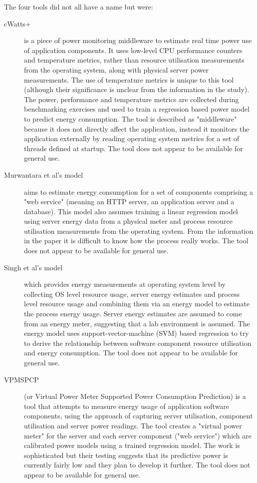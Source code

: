 The four tools did not all have a name but were:
\begin{description}
	\item[cWatts+] is a piece of power monitoring middleware to estimate real time power use of application components.  It uses low-level CPU performance counters and temperature metrics, rather than resource utilisation measurements from the operating system, along with physical server power measurements.  The use of temperature metrics is unique to this tool (although their significance is unclear from the information in the study).  The power, performance and temperature metrics are collected during benchmarking exercises and used to train a regression based power model to predict energy consumption.  The tool is described as "middleware" because it does not directly affect the application, instead it monitors the application externally by reading operating system metrics for a set of threads defined at startup. The tool does not appear to be available for general use. \cite{phung2017-agnosticpower}
	\item[Murwantara et al's model] aims to estimate energy consumption for a set of components comprising a "web service" (meaning an HTTP server, an application server and a database).  This model also assumes training a linear regression model using server energy data from a physical meter and process resource utilisation measurements from the operating system.  From the information in the paper it is difficult to know how the process really works. The tool does not appear to be available for general use. \cite{murwantara2014-webserviceenergy}
	\item [Singh et al's model] which provides energy measurements at operating system level by collecting OS level resource usage, server energy estimates and process level resource usage and combining them via an energy model to estimate the process energy usage.  Server energy estimates are assumed to come from an energy meter, suggesting that a lab environment is assumed. The energy model uses support-vector-machine (SVM) based regression to try to derive the relationship between software component resource utilisation and energy consumption.  The tool does not appear to be available for general use. \cite{singh2013-processenergyest}
	\item[VPMSPCP] (or Virtual Power Meter Supported Power Consumption Prediction) is a tool that attempts to measure energy usage of application software components, using the approach of capturing server utilisation, component utilisation and server power readings.  The tool creates a "virtual power meter" for the server and each server component ("web service") which are calibrated power models using a trained regression model.  The work is sophisticated but their testing suggests that its predictive power is currently fairly low and they plan to develop it further. The tool does not appear to be available for general use. \cite{liu2015-webservicepower}
\end{description}

